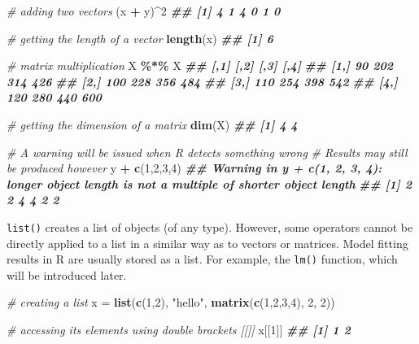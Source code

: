 \documentclass[
]{book}
\newenvironment{Shaded}{\begin{snugshade}}{\end{snugshade}}
\newcommand{\CommentTok}[1]{\textcolor[rgb]{0.56,0.35,0.01}{\textit{#1}}}
\newcommand{\DecValTok}[1]{\textcolor[rgb]{0.00,0.00,0.81}{#1}}
\newcommand{\DocumentationTok}[1]{\textcolor[rgb]{0.56,0.35,0.01}{\textbf{\textit{#1}}}}
\newcommand{\FunctionTok}[1]{\textcolor[rgb]{0.13,0.29,0.53}{\textbf{#1}}}
\newcommand{\NormalTok}[1]{#1}
\newcommand{\OtherTok}[1]{\textcolor[rgb]{0.56,0.35,0.01}{#1}}
\newcommand{\SpecialCharTok}[1]{\textcolor[rgb]{0.81,0.36,0.00}{\textbf{#1}}}
\newcommand{\StringTok}[1]{\textcolor[rgb]{0.31,0.60,0.02}{#1}}
\theoremstyle{definition}
\theoremstyle{definition}
\theoremstyle{definition}
\theoremstyle{definition}
\theoremstyle{remark}
\begin{document}
\begin{Shaded}
\begin{Highlighting}[]
    \CommentTok{\# adding two vectors}
\NormalTok{    (x }\SpecialCharTok{+}\NormalTok{ y)}\SpecialCharTok{\^{}}\DecValTok{2}
\DocumentationTok{\#\# [1] 4 1 4 0 1 0}
  
    \CommentTok{\# getting the length of a vector}
    \FunctionTok{length}\NormalTok{(x)}
\DocumentationTok{\#\# [1] 6}
    
    \CommentTok{\# matrix multiplication}
\NormalTok{    X }\SpecialCharTok{\%*\%}\NormalTok{ X}
\DocumentationTok{\#\#      [,1] [,2] [,3] [,4]}
\DocumentationTok{\#\# [1,]   90  202  314  426}
\DocumentationTok{\#\# [2,]  100  228  356  484}
\DocumentationTok{\#\# [3,]  110  254  398  542}
\DocumentationTok{\#\# [4,]  120  280  440  600}
    
    \CommentTok{\# getting the dimension of a matrix}
    \FunctionTok{dim}\NormalTok{(X)}
\DocumentationTok{\#\# [1] 4 4}
    
    \CommentTok{\# A warning will be issued when R detects something wrong}
    \CommentTok{\# Results may still be produced however}
\NormalTok{    y }\SpecialCharTok{+} \FunctionTok{c}\NormalTok{(}\DecValTok{1}\NormalTok{,}\DecValTok{2}\NormalTok{,}\DecValTok{3}\NormalTok{,}\DecValTok{4}\NormalTok{)}
\DocumentationTok{\#\# Warning in y + c(1, 2, 3, 4): longer object length is not a multiple of shorter object length}
\DocumentationTok{\#\# [1] 2 2 4 4 2 2}
\end{Highlighting}
\end{Shaded}

\texttt{list()} creates a list of objects (of any type). However, some operators cannot be directly applied to a list in a similar way as to vectors or matrices. Model fitting results in R are usually stored as a list. For example, the \texttt{lm()} function, which will be introduced later.

\begin{Shaded}
\begin{Highlighting}[]
    \CommentTok{\# creating a list}
\NormalTok{    x }\OtherTok{=} \FunctionTok{list}\NormalTok{(}\FunctionTok{c}\NormalTok{(}\DecValTok{1}\NormalTok{,}\DecValTok{2}\NormalTok{), }\StringTok{"hello"}\NormalTok{, }\FunctionTok{matrix}\NormalTok{(}\FunctionTok{c}\NormalTok{(}\DecValTok{1}\NormalTok{,}\DecValTok{2}\NormalTok{,}\DecValTok{3}\NormalTok{,}\DecValTok{4}\NormalTok{), }\DecValTok{2}\NormalTok{, }\DecValTok{2}\NormalTok{))}
  
    \CommentTok{\# accessing its elements using double brackets \textasciigrave{}[[]]\textasciigrave{} }
\NormalTok{    x[[}\DecValTok{1}\NormalTok{]]}
\DocumentationTok{\#\# [1] 1 2}
\end{Highlighting}
\end{Shaded}
\end{document}
